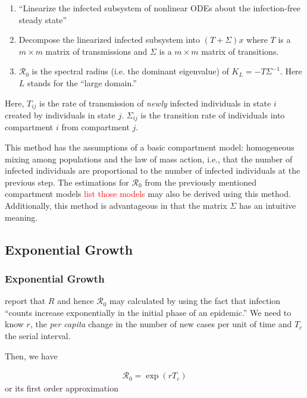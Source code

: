 \documentclass[12pt]{article}
\newcommand{\com}[1]{\textcolor{red}{ #1}}
\newcommand{\rr}{\ensuremath{\mathcal{R}_0}}
\begin{document}
\begin{enumerate}
\item ``Linearize the infected subsystem of nonlinear ODEs about the infection-free steady state''
\item Decompose the linearized infected subsystem into $(T + \Sigma )x$ where $T$ is a $m\times m$ matrix of transmissions and $\Sigma$ is a $m \times m$ matrix of transitions.
\item $\rr$ is the spectral radius (i.e. the dominant eigenvalue) of $K_L=-T \Sigma^{-1}$.  Here $L$ stands for the ``large domain.''
\end{enumerate}

Here, $T_{ij}$ is the rate of transmission of \textit{newly} infected individuals in state $i$ created by individuals in state $j$.  $\Sigma_{ij}$ is the transition rate of individuals into compartment $i$ from compartment $j$.

This method has the assumptions of a basic compartment model: homogeneous mixing among populations and the law of mass action, i.e., that the number of infected individuals are proportional to the number of infected individuals at the previous step.  The estimations for $\rr$ from the previously mentioned compartment models \com{list those models} may also be derived using this method.  Additionally, this method is advantageous in that the matrix $\Sigma$ has an intuitive meaning.


\subsection{Exponential Growth}\label{sec:exp-growth}

\subsubsection{Exponential Growth}
\label{sec:expgrowth}
\cite{wallinga2007generation} report that $R$ and hence $\rr$ may calculated by using the fact that infection ``counts increase exponentially in the initial phase of an epidemic.''  We need to know $r$, the \textit{per capita} change in the number of new cases per unit of time and $T_c$ the serial interval.

Then, we have

\begin{align}\label{eq:lotka}
\rr = \exp{(r T_c)}
\end{align}
or its first order approximation
\end{document}
